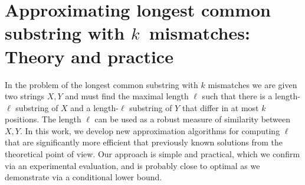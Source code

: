 \chapter{Approximating longest common substring with \texorpdfstring{$k$}{k}~mismatches: Theory and practice}

\newcommand{\inputLCS}[1]{}
\newcommand{\figLCS}[2]{\texttt{[image: Part\_Two/lcs/\#2]}}

\newcommand{\lcpe}{\mathrm{LCP}_{(1+\eps)k}}
\newcommand{\lcp}{\mathrm{LCP}_{\tilde{k}}}
\newcommand{\lcpk}{\mathrm{LCP}_{k}}
\newcommand{\lcsk}{\mathrm{LCS}_{k}}
\newcommand{\lcske}{\mathrm{LCS}_{(1+\eps)k}}
\newcommand{\lcsak}{\mathrm{LCS}_{\tilde{k}}}
\newcommand{\sk}{\mathrm{sk}}
\newcommand{\Prob}{\mathrm{Pr}}
\newcommand{\LCSp}{\textsf{LCS}\xspace}
\newcommand{\kLCS}{\textsf{LCS with $k$ Mismatches}\xspace}
\newcommand{\kApproxLCS}{\textsf{LCS with Approximately $k$ Mismatches}\xspace}
\newcommand{\Bichromatic}{\textsf{$(1+\gamma)$-approximate Bichromatic Closest Pair}\xspace}
\newcommand{\NN}{\textsf{Approximate Near Neighbour}\xspace}
\newcommand{\twentyquestions}{\textsf{Twenty Questions}\xspace}
\newcommand{\Carole}{\mathit{Carole}}
\newcommand{\pop}{\mathit{pop}}
\newcommand{\push}{\mathit{push}}
\newcommand{\ttop}{\mathit{top}}
\newcommand{\mmid}{\mathit{mid}}

\newcommand{\Hashes}{\mathcal{H}}
\newcommand{\Collisions}{C}
\newcommand{\Bad}{B}
\newcommand{\Projections}{\Pi}
\newcommand{\Pos}{\mathsf{P}}
\newcommand{\HD}{d_H}

\providecommand{\LCP}{\mathrm{LCP}}
\providecommand{\ceil}[1]{\ensuremath{\lceil#1\rceil}}
\providecommand{\eps}{\varepsilon}

\newcommand{\norm}[1]{\ensuremath{\lVert#1\rVert}}

\newcommand\restr[2]{{
  \left.\kern-\nulldelimiterspace
  #1 
  \vphantom{\big|}
  \right|_{#2} 
}}

\begin{small}
    In the problem of the longest common substring with $k$ mismatches we are given two strings $X, Y$ and must find the maximal length $\ell$ such that there is a length-$\ell$ substring of $X$ and a length-$\ell$ substring of $Y$ that differ in at most $k$ positions. The length $\ell$ can be used as a robust measure of similarity between $X, Y$. In this work, we develop new approximation algorithms for computing $\ell$ that are significantly more efficient that previously known solutions from the theoretical point of view. Our approach is simple and practical, which we confirm via an experimental evaluation, and is probably close to optimal as we demonstrate via a conditional lower bound.
\end{small}



